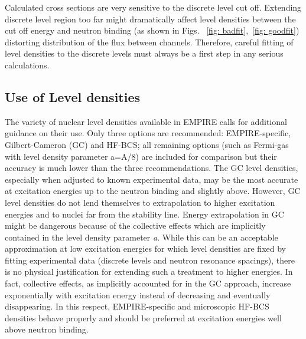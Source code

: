 Calculated cross sections are very sensitive to the discrete level cut off.
Extending discrete level region too far might dramatically affect level
densities between the cut off energy and neutron binding (as shown in Figs.~%
\ref{fig: badfit},~\ref{fig: goodfit}) distorting distribution of the flux
between channels. Therefore, careful fitting of level densities to the
discrete levels must always be a first step in any serious calculations.

\subsection{Use of Level densities}

The variety of nuclear level densities available in EMPIRE calls for
additional guidance on their use. Only three options are recommended:
EMPIRE-specific, Gilbert-Cameron (GC) and HF-BCS; all remaining options
(such as Fermi-gas with level density parameter a=A/8) are included for
comparison but their accuracy is much lower than the three recommendations.
The GC level densities, especially when adjusted to known experimental data,
may be the most accurate at excitation energies up to the neutron binding
and slightly above. However, GC level densities do not lend themselves to
extrapolation to higher excitation energies and to nuclei far from the
stability line. Energy extrapolation in GC might be dangerous because of the
collective effects which are implicitly contained in the level density
parameter \textit{a}. While this can be an acceptable approximation at low
excitation energies for which level densities are fixed by fitting
experimental data (discrete levels and neutron resonance spacings), there is
no physical justification for extending such a treatment to higher energies.
In fact, collective effects, as implicitly accounted for in the GC approach,
increase exponentially with excitation energy instead of decreasing and
eventually disappearing. In this respect, EMPIRE-specific and microscopic
HF-BCS densities behave properly and should be preferred at excitation
energies well above neutron binding.

